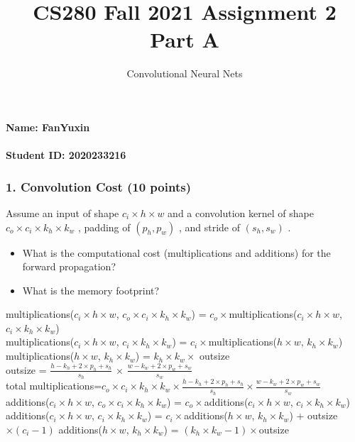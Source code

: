 \documentclass[12pt]{article}%
\begin{document}
\title{CS280 Fall 2021 Assignment 2 \\ Part A}
\author{Convolutional Neural Nets}
\maketitle

\paragraph{Name: FanYuxin}

\paragraph{Student ID: 2020233216}

\newpage


\subsubsection*{1. Convolution Cost (10 points)}
Assume an input of shape  $c_i\times h\times w$  and a convolution kernel of shape  $c_o\times c_i\times k_h\times k_w$ , padding of  $(p_h,p_w)$ , and stride of  $(s_h,s_w)$ .
\begin{itemize}
	\item What is the computational cost (multiplications and additions) for the forward propagation?
	\item What is the memory footprint?
\end{itemize}

\par

multiplications($c_i\times h\times w$, $c_o\times c_i\times k_h\times k_w$) = $c_o \times $multiplications($c_i\times h\times w$, $c_i\times k_h\times k_w$)\\
multiplications($c_i\times h\times w$, $c_i\times k_h\times k_w$) = $c_i\times$multiplications($h\times w$, $k_h\times k_w$)\\
multiplications($h\times w$, $k_h\times k_w$) = $k_h \times k_w \times$ outsize \\
outsize = $\frac{h-k_h+2\times p_h+s_h}{s_h}$ $\times$  $\frac{w-k_w+2\times p_w+s_w}{s_w}$\\
total multiplications=$c_o \times c_i \times k_h \times k_w \times \frac{h-k_h+2\times p_h+s_h}{s_h} \times \frac{w-k_w+2\times p_w+s_w}{s_w}$\\

additions($c_i\times h\times w$, $c_o\times c_i\times k_h\times k_w$) = $c_o \times $additions($c_i\times h\times w$, $c_i\times k_h\times k_w$)\\
additions($c_i\times h\times w$, $c_i\times k_h\times k_w$) = $c_i\times $additions($h\times w$, $ k_h\times k_w$) + outsize$\times (c_i-1)$
additions($h\times w$, $ k_h\times k_w$) = $(k_h\times k_w -1) \times $outsize
\end{document}
